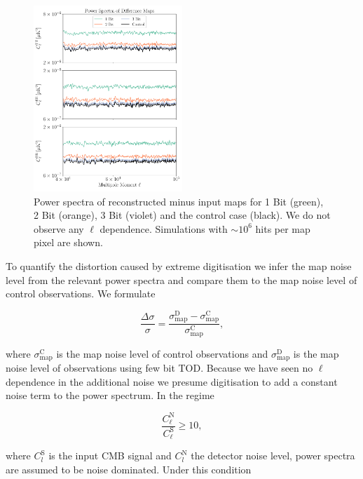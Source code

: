 \documentclass[apj]{emulateapj}
\begin{document}
\begin{figure}[htb]\centering
\includegraphics[width=0.5\textwidth,clip]{Plots/diffwn.pdf}
  \caption[Current ]{
  Power spectra of reconstructed minus input maps for 1 Bit (green), 2 Bit (orange), 3 Bit (violet) and the control case (black). We do not observe any $\ell$ dependence. Simulations with $\sim 10^6$ hits per map pixel are shown.
\label{fig:diffpswn}
}
\end{figure}

To quantify the distortion caused by extreme digitisation we infer the map noise level from the relevant power spectra and compare them to the map noise level of control observations. We formulate

\begin{equation} \label{eq:extramapnoise}
\frac{\Delta \sigma}{\sigma} = \frac{\sigma_{\mathrm{map}}^{\mathrm{D}}-\sigma_{\mathrm{map}}^{\mathrm{C}}}{\sigma_{\mathrm{map}}^{\mathrm{C}}},
\end{equation}

where $\sigma_{\mathrm{map}}^{\mathrm{C}}$ is the map noise level of control observations and $\sigma_{\mathrm{map}}^{\mathrm{D}}$ is the map noise level of observations using few bit TOD. Because we have seen no $\ell$ dependence in the additional noise we presume digitisation to add a constant noise term to the power spectrum. In the regime

\begin{equation} \frac{C_\ell^{\mathrm{N}}}{C_\ell^{\mathrm{S}}} \geq 10, \end{equation}

where $C_l^\mathrm{S}$ is the input CMB signal and $C_l^\mathrm{N}$ the detector noise level, power spectra are assumed to be noise dominated. Under this condition
\end{document}
